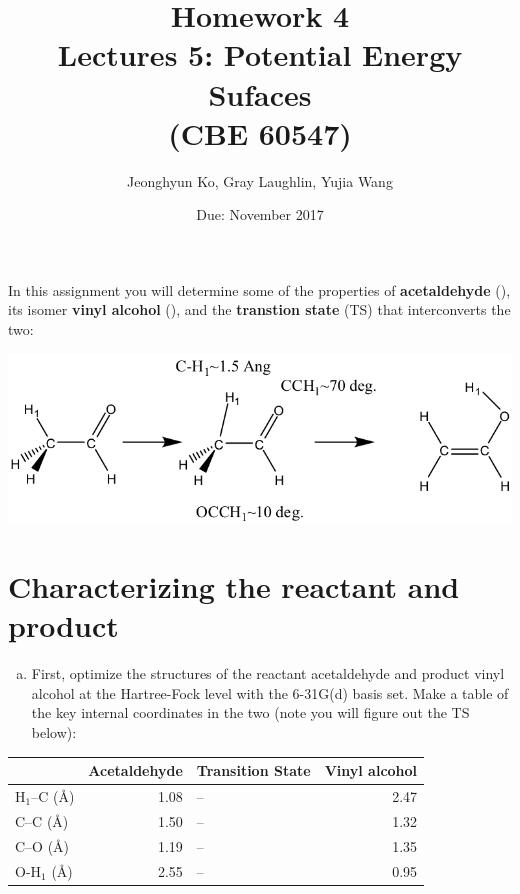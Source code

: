 \documentclass[11pt]{article}
\date{Due: November 2017}
\title{}
\begin{document}
\title{Homework 4\\Lectures 5: Potential Energy Sufaces\\(CBE 60547)}
\author{Jeonghyun Ko, Gray Laughlin, Yujia Wang}
\maketitle

In this assignment you will determine some of the properties of \textbf{acetaldehyde} (), its isomer \textbf{vinyl alcohol} (), and the \textbf{transtion state} (TS) that interconverts the two:

\begin{center}
\begin{center}
\includegraphics[width=.9\linewidth]{fig1.png}
\end{center}
\end{center}



\section{Characterizing the reactant and product}
\label{sec:org04e2a95}
\begin{enumerate}[(a)]
\item First, optimize the structures of the reactant acetaldehyde and product vinyl alcohol at the Hartree-Fock level with the 6-31G(d) basis set. Make a table of the key internal coordinates in the two (note you will figure out the TS below):
\end{enumerate}

\begin{center}
\begin{tabular}{lrlr}
\hline
 & Acetaldehyde & Transition State & Vinyl alcohol\\
\hline
H\(_{\text{1}}\)–C (\AA{}) & 1.08 & -- & 2.47\\
C–C (\AA{}) & 1.50 & -- & 1.32\\
C–O (\AA{}) & 1.19 & -- & 1.35\\
O-H\(_{\text{1}}\) (\AA{}) & 2.55 & -- & 0.95\\
\hline
\end{tabular}
\end{center}
\end{document}
